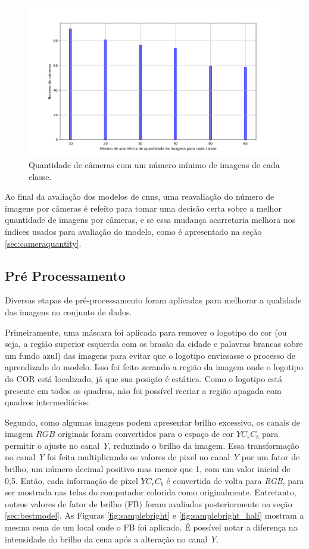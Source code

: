 \begin{figure}[htb]
\centerline{\includegraphics[width=1\linewidth]{images/balancedcodes.png}}
\caption{Quantidade de câmeras com um número mínimo de imagens de cada classe.}
\label{fig:balancedcodes}
\end{figure}

Ao final da avaliação dos modelos de \acrshort{cnn}s, uma reavaliação do número de imagens por câmeras é refeito para tomar uma decisão certa sobre a melhor quantidade de imagens por câmeras, 
e se essa mudança acarretaria melhora nos índices usados para avaliação do modelo, como é apresentado na seção \ref{sec:cameraquantity}.
\subsection{Pré Processamento}\label{subsec:datapreprocessing}

Diversas etapas de pré-processamento foram aplicadas para melhorar a qualidade das imagens no conjunto de dados.

Primeiramente, uma máscara foi aplicada para remover o logotipo do \acrshort{cor} (ou seja, a região superior esquerda com os brasão da cidade e palavras brancas sobre um fundo azul) das imagens para evitar que o logotipo enviesasse o processo de aprendizado do modelo. Isso foi feito zerando a região da imagem onde o logotipo do COR está localizado, já que sua posição é estática. Como o logotipo está presente em todos os quadros, não foi possível recriar a região apagada com quadros intermediários.

Segundo, como algumas imagens podem apresentar brilho excessivo, os canais de imagem $RGB$ originais foram convertidos para o espaço de cor $YC_rC_b$ para permitir o ajuste no canal \textit{Y}, 
reduzindo o brilho da imagem. Essa transformação no canal \textit{Y} foi feita multiplicando os valores de pixel no canal \textit{Y} por um fator de brilho, 
um número decimal positivo mas menor que 1, com um valor inicial de 0,5. 
Então, cada informação de pixel $YC_rC_b$ é convertida de volta para  \textit{RGB}, para ser mostrada nas telas do computador colorida como originalmente. 
Entretanto, outros valores de fator de brilho (FB) foram avaliados posteriormente na seção \ref{sec:bestmodel}.
As Figuras \ref{fig:samplebright} e \ref{fig:samplebright_half} mostram a mesma cena de um local onde o FB foi aplicado. 
É possível notar a diferença na intensidade do brilho da cena após a alteração no canal \textit{Y}.

